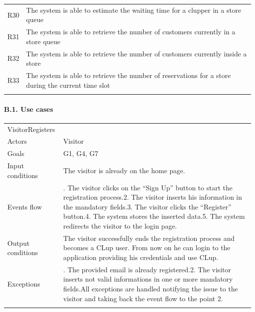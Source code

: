 \documentclass[
]{article}
\begin{document}
\begin{longtable}[]{@{}
  >{\raggedright\arraybackslash}p{}
  >{\raggedright\arraybackslash}p{}@{}}
R30 & The system is able to estimate the waiting time for a clupper in a
store queue \\ \addlinespace
R31 & The system is able to retrieve the number of customers currently
in a store queue \\ \addlinespace
R32 & The system is able to retrieve the number of customers currently
inside a store \\ \addlinespace
R33 & The system is able to retrieve the number of reservations for a
store during the current time slot \\ \addlinespace
\bottomrule
\end{longtable}

\hypertarget{b.1.-use-cases}{%
\paragraph{B.1. Use cases}\label{b.1.-use-cases}}

\begin{longtable}[]{@{}
  >{\raggedright\arraybackslash}p{}
  >{\raggedright\arraybackslash}p{}@{}}
\toprule
VisitorRegisters & \\ \addlinespace
\midrule
\endhead
Actors & Visitor \\ \addlinespace
Goals & G1, G4, G7 \\ \addlinespace
Input conditions & The visitor is already on the home
page. \\ \addlinespace
Events flow & 1. The visitor clicks on the ``Sign Up'' button to start
the registration process.2. The visitor inserts his information in the
mandatory fields.3. The visitor clicks the ``Register'' button.4. The
system stores the inserted data.5. The system redirects the visitor to
the login page. \\ \addlinespace
Output conditions & The visitor successfully ends the registration
process and becomes a CLup user. From now on he can login to the
application providing his credentials and use CLup. \\ \addlinespace
Exceptions & 1. The provided email is already registered.2. The visitor
inserts not valid informations in one or more mandatory fields.All
exceptions are handled notifying the issue to the visitor and taking
back the event flow to the point 2. \\ \addlinespace
\bottomrule
\end{longtable}
\end{document}
